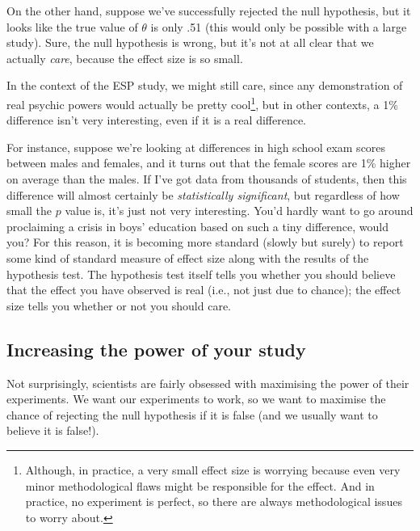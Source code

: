 \documentclass[
  11pt,
  a4paper,
  twoside,symmetric,openright]{book}
\theoremstyle{break}
\theoremstyle{break}
\begin{document}
On the other hand, suppose we've successfully rejected the null hypothesis, but it looks like the true value of \(\theta\) is only .51 (this would only be possible with a large study). Sure, the null hypothesis is wrong, but it's not at all clear that we actually \emph{care}, because the effect size is so small.

In the context of the ESP study, we might still care, since any demonstration of real psychic powers would actually be pretty cool\footnote{Although, in practice, a very small effect size is worrying because even very minor methodological flaws might be responsible for the effect. And in practice, no experiment is perfect, so there are always methodological issues to worry about.}, but in other contexts, a 1\% difference isn't very interesting, even if it is a real difference.

For instance, suppose we're looking at differences in high school exam scores between males and females, and it turns out that the female scores are 1\% higher on average than the males. If I've got data from thousands of students, then this difference will almost certainly be \emph{statistically significant}, but regardless of how small the \(p\) value is, it's just not very interesting. You'd hardly want to go around proclaiming a crisis in boys' education based on such a tiny difference, would you? For this reason, it is becoming more standard (slowly but surely) to report some kind of standard measure of effect size along with the results of the hypothesis test. The hypothesis test itself tells you whether you should believe that the effect you have observed is real (i.e., not just due to chance); the effect size tells you whether or not you should care.

\subsection{Increasing the power of your study}\label{increasing-the-power-of-your-study}

Not surprisingly, scientists are fairly obsessed with maximising the power of their experiments. We want our experiments to work, so we want to maximise the chance of rejecting the null hypothesis if it is false (and we usually want to believe it is false!).
\end{document}
